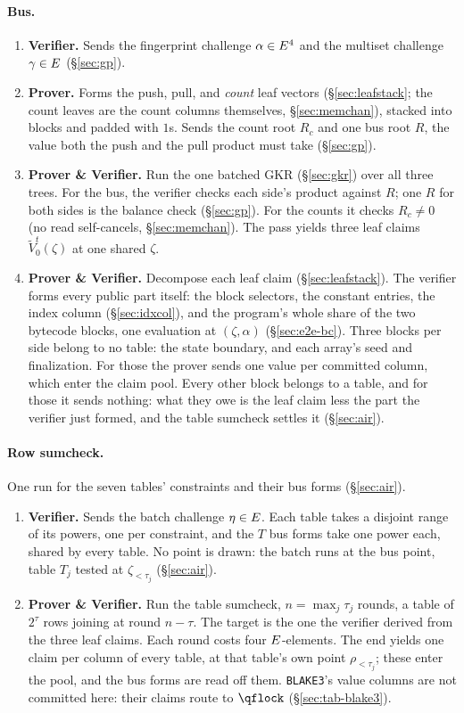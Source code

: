 \paragraph{Bus.}
\begin{enumerate}
\item \textbf{Verifier.} Sends the fingerprint challenge $\alpha\in E^{4}$ and the multiset challenge $\gamma\in E$ (\S\ref{sec:gp}).
\item \textbf{Prover.} Forms the push, pull, and \emph{count} leaf vectors (\S\ref{sec:leafstack}; the count leaves are the count columns themselves, \S\ref{sec:memchan}), stacked into blocks and padded with $1$s. Sends the count root $R_c$ and one bus root $R$, the value both the push and the pull product must take (\S\ref{sec:gp}).
\item \textbf{Prover \& Verifier.} Run the one batched GKR (\S\ref{sec:gkr}) over all three trees. For the bus, the verifier checks each side's product against $R$; one $R$ for both sides is the balance check (\S\ref{sec:gp}). For the counts it checks $R_c\neq0$ (no read self-cancels, \S\ref{sec:memchan}). The pass yields three leaf claims $\widetilde V^{t}_0(\zeta)$ at one shared $\zeta$.
\item \textbf{Prover \& Verifier.} Decompose each leaf claim (\S\ref{sec:leafstack}). The verifier forms every public part itself: the block selectors, the constant entries, the index column (\S\ref{sec:idxcol}), and the program's whole share of the two bytecode blocks, one evaluation at $(\zeta,\alpha)$ (\S\ref{sec:e2e-bc}). Three blocks per side belong to no table: the state boundary, and each array's seed and finalization. For those the prover sends one value per committed column, which enter the claim pool. Every other block belongs to a table, and for those it sends nothing: what they owe is the leaf claim less the part the verifier just formed, and the table sumcheck settles it (\S\ref{sec:air}).
\end{enumerate}

\paragraph{Row sumcheck.} One run for the seven tables' constraints and their bus forms (\S\ref{sec:air}).
\begin{enumerate}
\item \textbf{Verifier.} Sends the batch challenge $\eta\in E$. Each table takes a disjoint range of its powers, one per constraint, and the $T$ bus forms take one power each, shared by every table. No point is drawn: the batch runs at the bus point, table $T_j$ tested at $\zeta_{<\tau_j}$ (\S\ref{sec:air}).
\item \textbf{Prover \& Verifier.} Run the table sumcheck, $n=\max_j\tau_j$ rounds, a table of $2^{\tau}$ rows joining at round $n-\tau$. The target is the one the verifier derived from the three leaf claims. Each round costs four $E$-elements. The end yields one claim per column of every table, at that table's own point $\rho_{<\tau_j}$; these enter the pool, and the bus forms are read off them. \texttt{BLAKE3}'s value columns are not committed here: their claims route to $\qflock$ (\S\ref{sec:tab-blake3}).
\end{enumerate}

